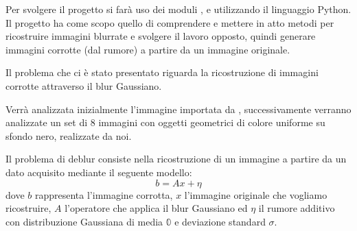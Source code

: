 
Per svolgere il progetto si farà uso dei moduli ,  e 
utilizzando il linguaggio Python. 
Il progetto ha come scopo quello di comprendere e mettere in atto metodi per ricostruire 
immagini blurrate e svolgere il lavoro opposto, quindi generare immagini corrotte (dal rumore) a partire da un immagine originale. 

Il problema che ci è stato presentato riguarda la ricostruzione di 
immagini corrotte attraverso il blur Gaussiano.

Verrà analizzata inizialmente l'immagine  importata da
, successivamente verranno analizzate un set di 8 immagini con oggetti geometrici di colore uniforme su sfondo nero, realizzate da noi.

Il problema di deblur consiste nella ricostruzione di un immagine a partire da un dato acquisito mediante il seguente modello:
\[b=Ax+\eta\]
dove $b$ rappresenta l'immagine corrotta, $x$ l'immagine originale che vogliamo ricostruire, $A$ l'operatore che applica il blur Gaussiano ed $\eta$ il rumore additivo con distribuzione Gaussiana di  media $\mathbb{0}$ e deviazione standard $\sigma$.
